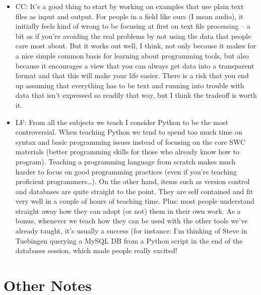 \documentclass{article}
\begin{document}
\begin{itemize}
  \item CC: It's a good thing to start by working on examples that use
    plain text files as input and output.  For people in a field like
    ours (I mean audio), it initially feels kind of wrong to be
    focusing at first on text file processing -- a bit as if you're
    avoiding the real problems by not using the data that people care
    most about. But it works out well, I think, not only because it
    makes for a nice simple common basis for learning about
    programming tools, but also because it encourages a view that you
    can always get data into a transparent format and that this will
    make your life easier.  There is a risk that you end up assuming
    that everything has to be text and running into trouble with data
    that isn't expressed so readily that way, but I think the tradeoff
    is worth it.

  \item LF: From all the subjects we teach I consider Python to be the
    most controversial. When teaching Python we tend to spend too much
    time on syntax and basic programming issues instead of focusing on
    the core SWC materials (better programming skills for those who
    already know how to program). Teaching a programming language from
    scratch makes much harder to focus on good programming practices
    (even if you're teaching proficient programmers{\ldots}).  On the
    other hand, items such as version control and databases are quite
    straight to the point. They are self contained and fit very well
    in a couple of hours of teaching time. Plus: most people
    understand straight away how they can adopt (or not) them in their
    own work. As a bonus, whenever we teach how they can be used with
    the other tools we've already taught, it's usually a success (for
    instance: I'm thinking of Steve in Tuebingen querying a MySQL DB
    from a Python script in the end of the databases session, which
    made people really excited!

\end{itemize}

\section{Other Notes}
\end{document}
